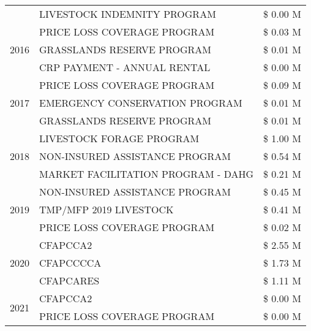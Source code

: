 \begin{tabular}{llr}
 & LIVESTOCK INDEMNITY PROGRAM & \$ 0.00 M \\
\cline{1-3}
\multirow[t]{3}{*}{2016} & PRICE LOSS COVERAGE PROGRAM                   & \$ 0.03 M \\
 & GRASSLANDS RESERVE PROGRAM                    & \$ 0.01 M \\
 & CRP PAYMENT - ANNUAL RENTAL                   & \$ 0.00 M \\
\cline{1-3}
\multirow[t]{3}{*}{2017} & PRICE LOSS COVERAGE PROGRAM & \$ 0.09 M \\
 & EMERGENCY CONSERVATION PROGRAM & \$ 0.01 M \\
 & GRASSLANDS RESERVE PROGRAM & \$ 0.01 M \\
\cline{1-3}
\multirow[t]{3}{*}{2018} & LIVESTOCK FORAGE PROGRAM & \$ 1.00 M \\
 & NON-INSURED ASSISTANCE PROGRAM & \$ 0.54 M \\
 & MARKET FACILITATION PROGRAM - DAHG & \$ 0.21 M \\
\cline{1-3}
\multirow[t]{3}{*}{2019} & NON-INSURED ASSISTANCE PROGRAM & \$ 0.45 M \\
 & TMP/MFP 2019 LIVESTOCK & \$ 0.41 M \\
 & PRICE LOSS COVERAGE PROGRAM & \$ 0.02 M \\
\cline{1-3}
\multirow[t]{3}{*}{2020} & CFAPCCA2 & \$ 2.55 M \\
 & CFAPCCCCA & \$ 1.73 M \\
 & CFAPCARES & \$ 1.11 M \\
\cline{1-3}
\multirow[t]{2}{*}{2021} & CFAPCCA2 & \$ 0.00 M \\
 & PRICE LOSS COVERAGE PROGRAM & \$ 0.00 M \\
\cline{1-3}
\bottomrule
\end{tabular}
